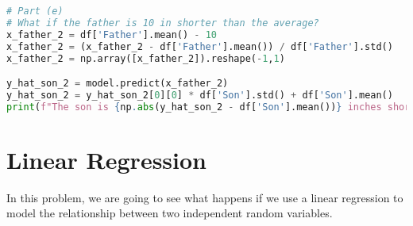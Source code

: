 \documentclass{article}
\begin{document}
\begin{enumerate}[label={(\alph*)}]
\begin{lstlisting}[language=Python, caption=Standard Error and Confidence
    Interval for $T$]
# Part (e)
# What if the father is 10 in shorter than the average?
x_father_2 = df['Father'].mean() - 10
x_father_2 = (x_father_2 - df['Father'].mean()) / df['Father'].std()
x_father_2 = np.array([x_father_2]).reshape(-1,1)

y_hat_son_2 = model.predict(x_father_2)
y_hat_son_2 = y_hat_son_2[0][0] * df['Son'].std() + df['Son'].mean()
print(f"The son is {np.abs(y_hat_son_2 - df['Son'].mean())} inches shorter than the average")
\end{lstlisting}
\end{enumerate}
\pagebreak

\section{Linear Regression}
In this problem, we are going to see what happens if we use a linear regression to 
model the relationship between two independent random variables.
\end{document}
